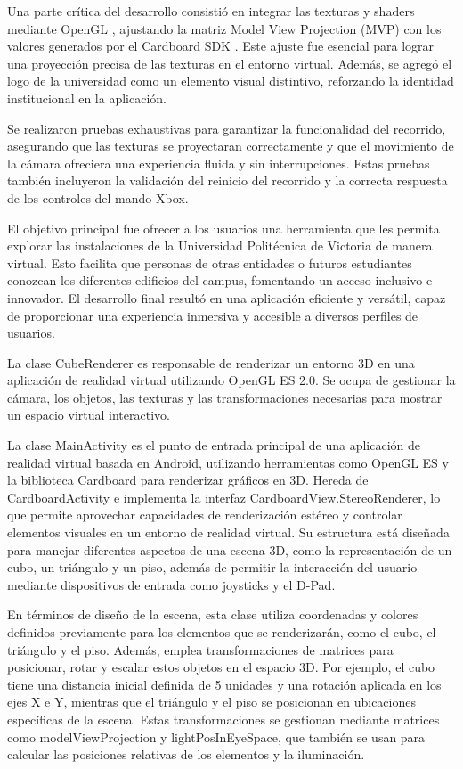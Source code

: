 \documentclass[conference]{IEEEtran}
\begin{document}
Una parte crítica del desarrollo consistió en integrar las texturas y shaders mediante OpenGL \cite{Sh:3}, ajustando la matriz Model View Projection (MVP) \cite{Sh:9} con los valores generados por el Cardboard SDK \cite{Sh:8}. Este ajuste fue esencial para lograr una proyección precisa de las texturas en el entorno virtual. Además, se agregó el logo de la universidad como un elemento visual distintivo, reforzando la identidad institucional en la aplicación.

Se realizaron pruebas exhaustivas para garantizar la funcionalidad del recorrido, asegurando que las texturas se proyectaran correctamente y que el movimiento de la cámara ofreciera una experiencia fluida y sin interrupciones. Estas pruebas también incluyeron la validación del reinicio del recorrido y la correcta respuesta de los controles del mando Xbox.

El objetivo principal fue ofrecer a los usuarios una herramienta que les permita explorar las instalaciones de la Universidad Politécnica de Victoria de manera virtual. Esto facilita que personas de otras entidades o futuros estudiantes conozcan los diferentes edificios del campus, fomentando un acceso inclusivo e innovador. El desarrollo final resultó en una aplicación eficiente y versátil, capaz de proporcionar una experiencia inmersiva y accesible a diversos perfiles de usuarios.

La clase CubeRenderer es responsable de renderizar un entorno 3D en una aplicación de realidad virtual utilizando OpenGL ES 2.0. Se ocupa de gestionar la cámara, los objetos, las texturas y las transformaciones necesarias para mostrar un espacio virtual interactivo.


La clase MainActivity es el punto de entrada principal de una aplicación de realidad virtual basada en Android, utilizando herramientas como OpenGL ES y la biblioteca Cardboard para renderizar gráficos en 3D. Hereda de CardboardActivity e implementa la interfaz CardboardView.StereoRenderer, lo que permite aprovechar capacidades de renderización estéreo y controlar elementos visuales en un entorno de realidad virtual. Su estructura está diseñada para manejar diferentes aspectos de una escena 3D, como la representación de un cubo, un triángulo y un piso, además de permitir la interacción del usuario mediante dispositivos de entrada como joysticks y el D-Pad.

En términos de diseño de la escena, esta clase utiliza coordenadas y colores definidos previamente para los elementos que se renderizarán, como el cubo, el triángulo y el piso. Además, emplea transformaciones de matrices para posicionar, rotar y escalar estos objetos en el espacio 3D. Por ejemplo, el cubo tiene una distancia inicial definida de 5 unidades y una rotación aplicada en los ejes X e Y, mientras que el triángulo y el piso se posicionan en ubicaciones específicas de la escena. Estas transformaciones se gestionan mediante matrices como modelViewProjection y lightPosInEyeSpace, que también se usan para calcular las posiciones relativas de los elementos y la iluminación.
\end{document}
